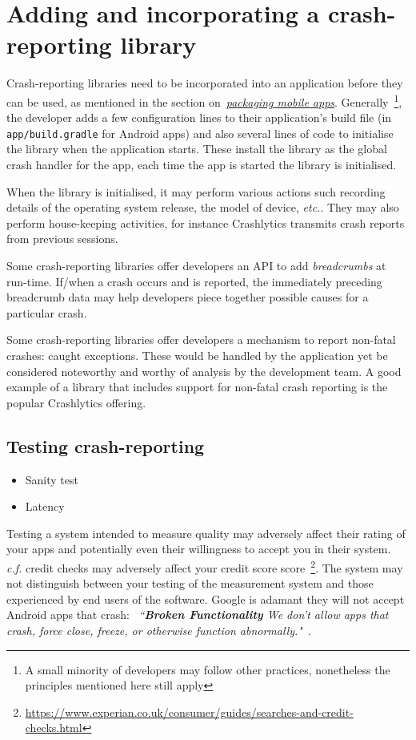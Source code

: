 \section{Adding and incorporating a crash-reporting library}
Crash-reporting libraries need to be incorporated into an application before they can be used, as mentioned in the section on~\href{section-packaging-mobile-apps}{\emph{packaging mobile apps}}. Generally~\footnote{A small minority of developers may follow other practices, nonetheless the principles mentioned here still apply}, the developer adds a few configuration lines to their application's build file (in \texttt{app/build.gradle} for Android apps) and also several lines of code to initialise the library when the application starts. These install the library as the global crash handler for the app, each time the app is started the library is initialised. 

When the library is initialised, it may perform various actions such recording details of the operating system release, the model of device, \emph{etc.}. They may also perform house-keeping activities, for instance Crashlytics transmits crash reports from previous sessions.

Some crash-reporting libraries offer developers an API to add \emph{breadcrumbs} at run-time. If/when a crash occurs and is reported, the immediately preceding breadcrumb data may help developers piece together possible causes for a particular crash.

Some crash-reporting libraries offer developers a mechanism to report non-fatal crashes: caught exceptions. These would be handled by the application yet be considered noteworthy and worthy of analysis by the development team. A good example of a library that includes support for non-fatal crash reporting is the popular Crashlytics offering.  

\subsection{Testing crash-reporting}
\begin{itemize}
    \item Sanity test
    \item Latency
\end{itemize}

Testing a system intended to measure quality may adversely affect their rating of your apps and potentially even their willingness to accept you in their system. \emph{c.f.} credit checks may adversely affect your credit score score~\footnote{\url{https://www.experian.co.uk/consumer/guides/searches-and-credit-checks.html}}. The system may not distinguish between your testing of the measurement system and those experienced by end users of the software. Google is adamant they will not accept Android apps that crash: ~\emph{``\textbf{Broken Functionality} We don’t allow apps that crash, force close, freeze, or otherwise function abnormally."}~\cite{google_play_developer_policy_center}.

